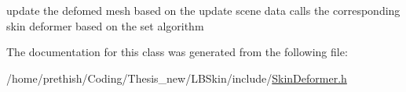 update the defomed mesh based on the update scene data calls the corresponding skin deformer based on the set algorithm 



The documentation for this class was generated from the following file\-:\begin{DoxyCompactItemize}
\item 
/home/prethish/\-Coding/\-Thesis\-\_\-new/\-L\-B\-Skin/include/\hyperlink{_skin_deformer_8h}{Skin\-Deformer.\-h}\end{DoxyCompactItemize}
